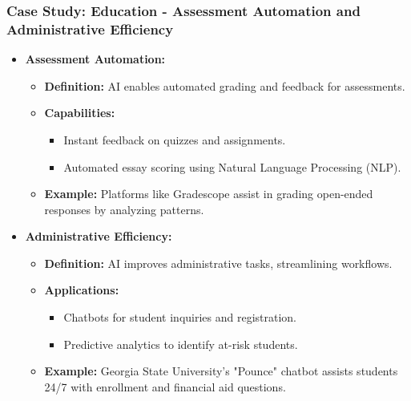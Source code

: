 \documentclass[aspectratio=169]{beamer}
\begin{document}
\begin{frame}[fragile]
    \frametitle{Case Study: Education - Assessment Automation and Administrative Efficiency}
    \begin{itemize}
        \item \textbf{Assessment Automation:} 
          \begin{itemize}
              \item \textbf{Definition:} AI enables automated grading and feedback for assessments.
              \item \textbf{Capabilities:} 
                \begin{itemize}
                    \item Instant feedback on quizzes and assignments.
                    \item Automated essay scoring using Natural Language Processing (NLP).
                \end{itemize}
              \item \textbf{Example:} Platforms like Gradescope assist in grading open-ended responses by analyzing patterns.
          \end{itemize}
        \item \textbf{Administrative Efficiency:} 
          \begin{itemize}
              \item \textbf{Definition:} AI improves administrative tasks, streamlining workflows.
              \item \textbf{Applications:} 
                \begin{itemize}
                    \item Chatbots for student inquiries and registration.
                    \item Predictive analytics to identify at-risk students.
                \end{itemize}
              \item \textbf{Example:} Georgia State University’s "Pounce" chatbot assists students 24/7 with enrollment and financial aid questions.
          \end{itemize}
    \end{itemize}
\end{frame}
\end{document}
